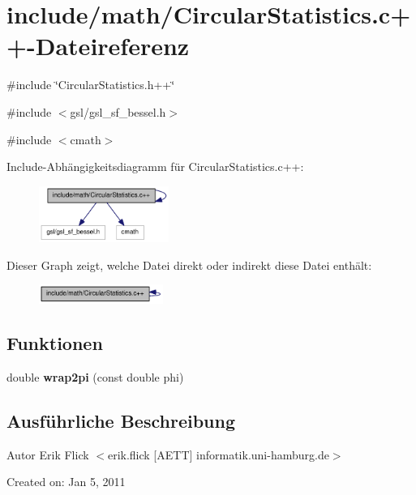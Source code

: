 \hypertarget{CircularStatistics_8c_09_09}{
\section{include/math/CircularStatistics.c++-\/Dateireferenz}
\label{CircularStatistics_8c_09_09}
}
{\ttfamily \#include \char`\"{}CircularStatistics.h++\char`\"{}}\par
{\ttfamily \#include $<$gsl/gsl\_\-sf\_\-bessel.h$>$}\par
{\ttfamily \#include $<$cmath$>$}\par
Include-\/Abhängigkeitsdiagramm für CircularStatistics.c++:\nopagebreak
\begin{figure}[H]
\begin{center}
\leavevmode
\includegraphics[width=120pt]{CircularStatistics_8c_09_09__incl}
\end{center}
\end{figure}
Dieser Graph zeigt, welche Datei direkt oder indirekt diese Datei enthält:\nopagebreak
\begin{figure}[H]
\begin{center}
\leavevmode
\includegraphics[width=115pt]{CircularStatistics_8c_09_09__dep__incl}
\end{center}
\end{figure}
\subsection*{Funktionen}
\begin{DoxyCompactItemize}
\item 
\hypertarget{CircularStatistics_8c_09_09_a53bb96d37a7af4fd27ce73a33a69c63a}{
double {\bfseries wrap2pi} (const double phi)}
\label{CircularStatistics_8c_09_09_a53bb96d37a7af4fd27ce73a33a69c63a}

\end{DoxyCompactItemize}


\subsection{Ausführliche Beschreibung}
\begin{DoxyAuthor}{Autor}
Erik Flick $<$erik.flick \mbox{[}AETT\mbox{]} informatik.uni-\/hamburg.de$>$
\end{DoxyAuthor}
Created on: Jan 5, 2011 